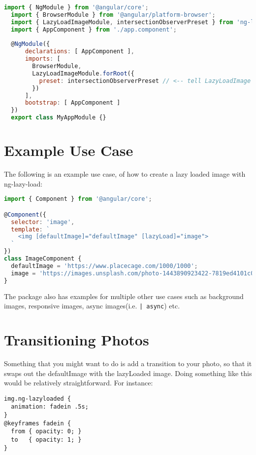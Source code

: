 
\begin{lstlisting}[language=javascript]
  import { NgModule } from '@angular/core';
  import { BrowserModule } from '@angular/platform-browser';
  import { LazyLoadImageModule, intersectionObserverPreset } from 'ng-lazyload-image'; // <-- include intersectionObserverPreset
  import { AppComponent } from './app.component';
  
  @NgModule({
      declarations: [ AppComponent ],
      imports: [
        BrowserModule,
        LazyLoadImageModule.forRoot({
          preset: intersectionObserverPreset // <-- tell LazyLoadImage that you want to use IntersectionObserver
        })
      ],
      bootstrap: [ AppComponent ]
  })
  export class MyAppModule {}
\end{lstlisting}

\section{Example Use Case}
The following is an example use case, of how to create a lazy loaded image 
with ng-lazy-load: 
\begin{lstlisting}[language=javascript]
import { Component } from '@angular/core';

@Component({
  selector: 'image',
  template: `
    <img [defaultImage]="defaultImage" [lazyLoad]="image">
  `
})
class ImageComponent {
  defaultImage = 'https://www.placecage.com/1000/1000';
  image = 'https://images.unsplash.com/photo-1443890923422-7819ed4101c0?fm=jpg';
}
\end{lstlisting}

The package also has examples for multiple other use cases such as background 
images, responsive images, async images(i.e. \lstinline{| async}) etc. 

\section{Transitioning Photos}
Something that you might want to do is add a transition to your photo, so that 
it swaps out the defaultImage with the lazyLoaded image. Doing something like 
this would be relatively straightforward. For instance: 
\begin{lstlisting}
img.ng-lazyloaded {
  animation: fadein .5s;
}
@keyframes fadein {
  from { opacity: 0; }
  to   { opacity: 1; }
}  
\end{lstlisting}

